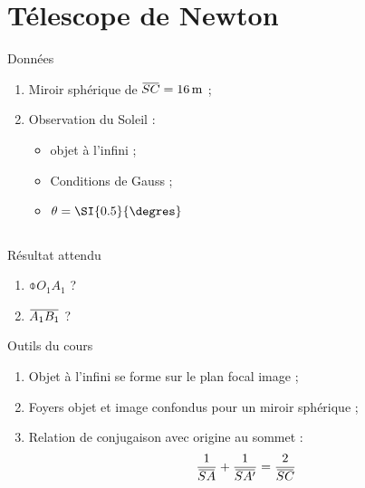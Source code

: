 \documentclass[10pt,a5paper,notitlepage]{book}
\begin{document}
\section{Télescope de Newton}
\begin{NCdefi}{Données}
    \begin{enumerate}
        \item Miroir sphérique de $\SC = \SI{16}{m}$ ;
        \item Observation du Soleil :
            \begin{itemize}
                \item objet à l'infini ;
                \item Conditions de Gauss ;
                \item $\t = \SI{0.5}{\degres}$
            \end{itemize}
    \end{enumerate}
\end{NCdefi}

\subsection{}

\begin{NCprop}{Résultat attendu}
    \begin{enumerate}
        \item $\obar{O_1A_1}$ ?
        \item $\ABa$ ?
    \end{enumerate}
\end{NCprop}

\begin{NCdemo}{Outils du cours}
    \begin{enumerate}
        \item Objet à l'infini se forme sur le plan focal image ;
        \item Foyers objet et image confondus pour un miroir sphérique ;
        \item Relation de conjugaison avec origine au sommet :
            \[ \frac{1}{\SA} + \frac{1}{\SAp} = \frac{2}{\SC} \]
    \end{enumerate}
\end{NCdemo}
\end{document}
